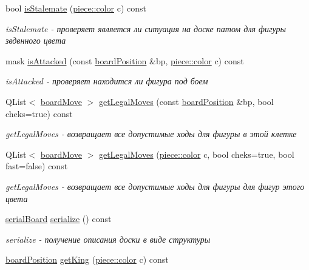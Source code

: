 \begin{DoxyCompactItemize}
bool \hyperlink{classboard_a50063bac8842217a3acb6d6d7732c6b0}{is\+Stalemate} (\hyperlink{classpiece_a0e121e5952345fd0e7014a8e6a1fbbda}{piece\+::color} c) const 
\begin{DoxyCompactList}\small\item\em is\+Stalemate -\/ проверяет является ли ситуация на доске патом для фигуры звдвнного цвета \end{DoxyCompactList}\item 
mask \hyperlink{classboard_ab83d3af8ff3ac068ae086f148fdbcf07}{is\+Attacked} (const \hyperlink{classboard_position}{board\+Position} \&bp, \hyperlink{classpiece_a0e121e5952345fd0e7014a8e6a1fbbda}{piece\+::color} c) const 
\begin{DoxyCompactList}\small\item\em is\+Attacked -\/ проверяет находится ли фигура под боем \end{DoxyCompactList}\item 
Q\+List$<$ \hyperlink{classboard_move}{board\+Move} $>$ \hyperlink{classboard_a8282e47422a657a2683ede9607310c89}{get\+Legal\+Moves} (const \hyperlink{classboard_position}{board\+Position} \&bp, bool cheks=true) const 
\begin{DoxyCompactList}\small\item\em get\+Legal\+Moves -\/ возвращает все допустимые ходы для фигуры в этой клетке \end{DoxyCompactList}\item 
Q\+List$<$ \hyperlink{classboard_move}{board\+Move} $>$ \hyperlink{classboard_a0868c4cf8b6f94269a32cc75d8917016}{get\+Legal\+Moves} (\hyperlink{classpiece_a0e121e5952345fd0e7014a8e6a1fbbda}{piece\+::color} c, bool cheks=true, bool fast=false) const 
\begin{DoxyCompactList}\small\item\em get\+Legal\+Moves -\/ возвращает все допустимые ходы для фигуры для фигур этого цвета \end{DoxyCompactList}\item 
\hyperlink{structserial_board}{serial\+Board} \hyperlink{classboard_a9e098dc31fc1f9fc48ac23fafd4834ea}{serialize} () const 
\begin{DoxyCompactList}\small\item\em serialize -\/ получение описания доски в виде структуры \end{DoxyCompactList}\item 
\hyperlink{classboard_position}{board\+Position} \hyperlink{classboard_ad4b7af35cfca5af432a87a8e28a65d63}{get\+King} (\hyperlink{classpiece_a0e121e5952345fd0e7014a8e6a1fbbda}{piece\+::color} c) const 

\end{DoxyCompactItemize}
